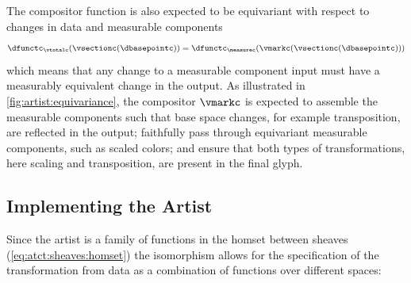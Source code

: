 \documentclass[review]{vgtc}
\theoremstyle{definition}
\theoremstyle{remark}
\begin{document}
The compositor function is also expected to be equivariant with respect to changes in data and measurable components
\begin{equation}
  \label{eq:construnction:q:verify:base}
  \dfunctc_{\vtotalc}(\vsectionc(\dbasepointc)) = \dfunctc_{\measurec}(\vmarkc(\vsectionc(\dbasepointc)))
\end{equation}
which means that any change to a measurable component input must have a measurably equivalent change in the output. As illustrated in \autoref{fig:artist:equivariance}, the compositor $\vmarkc$ is expected to assemble the measurable components such that base space changes, for example transposition, are reflected in the output; faithfully pass through equivariant measurable components, such as scaled colors; and ensure that both types of transformations, here scaling and transposition, are present in the final glyph.

\subsection{Implementing the Artist}
Since the artist is a family of functions in the homset between sheaves (\autoref{eq:atct:sheaves:homset}) the isomorphism allows for the specification of the transformation from data as a combination of functions over different spaces:
\end{document}
